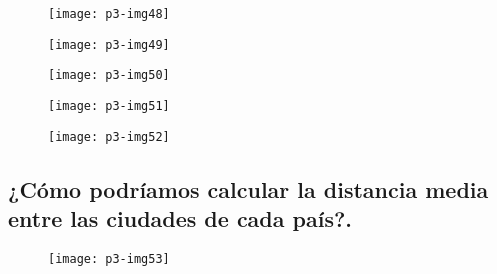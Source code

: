 \documentclass[10pt]{article}
\begin{document}
\begin{figure}[H]
	\begin{center}
 		\texttt{[image: p3-img48]}
	\end{center} 
\end{figure}

\begin{figure}[H]
	\begin{center}
 		\texttt{[image: p3-img49]}
	\end{center} 
\end{figure}

\begin{figure}[H]
	\begin{center}
 		\texttt{[image: p3-img50]}
	\end{center} 
\end{figure}

\begin{figure}[H]
	\begin{center}
 		\texttt{[image: p3-img51]}
	\end{center} 
\end{figure}

\begin{figure}[H]
	\begin{center}
 		\texttt{[image: p3-img52]}
	\end{center} 
\end{figure}

 
\subsection{¿Cómo podríamos calcular la distancia media entre las ciudades de cada país?.}

\begin{figure}[H]
	\begin{center}
 		\texttt{[image: p3-img53]}
	\end{center} 
\end{figure}
\end{document}
